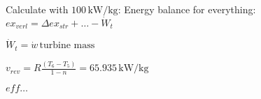 Calculate with \( 100 \, \text{kW/kg} \):  
Energy balance for everything:  
\( ex_{verl} = \Delta ex_{str} + \dots - \dot{W}_t \)  

\( \dot{W}_t = \dot{w} \, \text{turbine mass} \)  

\( v_{rev} = R \frac{(T_6 - T_5)}{1 - n} = 65.935 \, \text{kW/kg} \)  

\( eff \dots \)